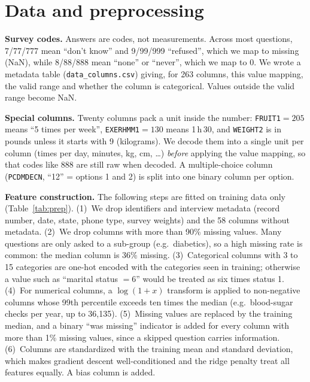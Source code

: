 \documentclass[10pt,conference,compsocconf]{IEEEtran}
\begin{document}
\section{Data and preprocessing}
\label{sec:prep}

\textbf{Survey codes.} Answers are codes, not measurements. Across most
questions, 7/77/777 mean ``don't know'' and 9/99/999 ``refused'', which we
map to missing (NaN), while 8/88/888 mean ``none'' or ``never'', which we map
to $0$. We wrote a metadata table (\texttt{data\_columns.csv}) giving, for 263
columns, this value mapping, the valid range and whether the column is
categorical. Values outside the valid range become NaN.

\textbf{Special columns.} Twenty columns pack a unit inside the number:
\texttt{FRUIT1}$=205$ means ``5 times per week'', \texttt{EXERHMM1}$=130$
means 1\,h\,30, and \texttt{WEIGHT2} is in pounds unless it starts with 9
(kilograms). We decode them into a single unit per column (times per day,
minutes, kg, cm, \dots) \emph{before} applying the value mapping, so that
codes like 888 are still raw when decoded. A multiple-choice column
(\texttt{PCDMDECN}, ``12'' = options 1 and 2) is split into one binary column
per option.

\textbf{Feature construction.} The following steps are fitted on training data
only (Table~\ref{tab:prep}).
(1)~We drop identifiers and interview metadata (record number, date, state,
phone type, survey weights) and the 58 columns without metadata.
(2)~We drop columns with more than 90\% missing values. Many questions are
only asked to a sub-group (e.g.\ diabetics), so a high missing rate is common:
the median column is 36\% missing.
(3)~Categorical columns with 3 to 15 categories are one-hot encoded with the
categories seen in training; otherwise a value such as ``marital status $=6$''
would be treated as six times status 1.
(4)~For numerical columns, a $\log(1+x)$ transform is applied to non-negative
columns whose 99th percentile exceeds ten times the median (e.g.\ blood-sugar
checks per year, up to 36{,}135).
(5)~Missing values are replaced by the training median, and a binary
``was missing'' indicator is added for every column with more than 1\%
missing values, since a skipped question carries information.
(6)~Columns are standardized with the training mean and standard deviation,
which makes gradient descent well-conditioned and the ridge penalty treat all
features equally. A bias column is added.
\end{document}
